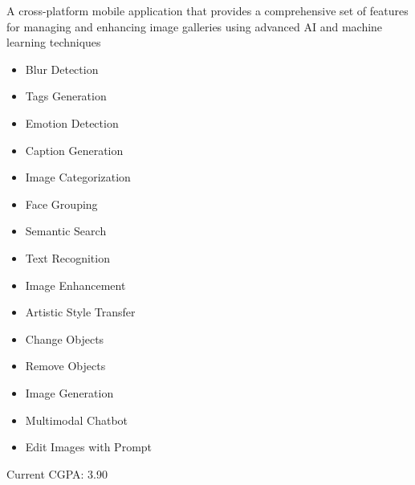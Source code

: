 \documentclass[10pt,a4paper,ragged2e,withhyper]{altacv}
\begin{document}
\begin{paracol}{2}



A cross-platform mobile application that provides a comprehensive set of features for managing and enhancing image galleries using advanced AI and machine learning techniques

\setlength{\columnsep}{0.25cm}
\setlength{\multicolsep}{0.25cm}

\begin{multicols}{3}
\begin{itemize}
\item Blur Detection
\item Tags Generation
\item Emotion Detection
\item Caption Generation
\item Image Categorization

\item Face Grouping
\item Semantic Search
\item Text Recognition
\item Image Enhancement
\item Artistic Style Transfer

\item Change Objects
\item Remove Objects
\item Image Generation
\item Multimodal Chatbot
\item Edit Images with Prompt
\end{itemize}
\end{multicols}

\switchcolumn

\smallskip


Current CGPA: 3.90


\end{paracol}
\end{document}
